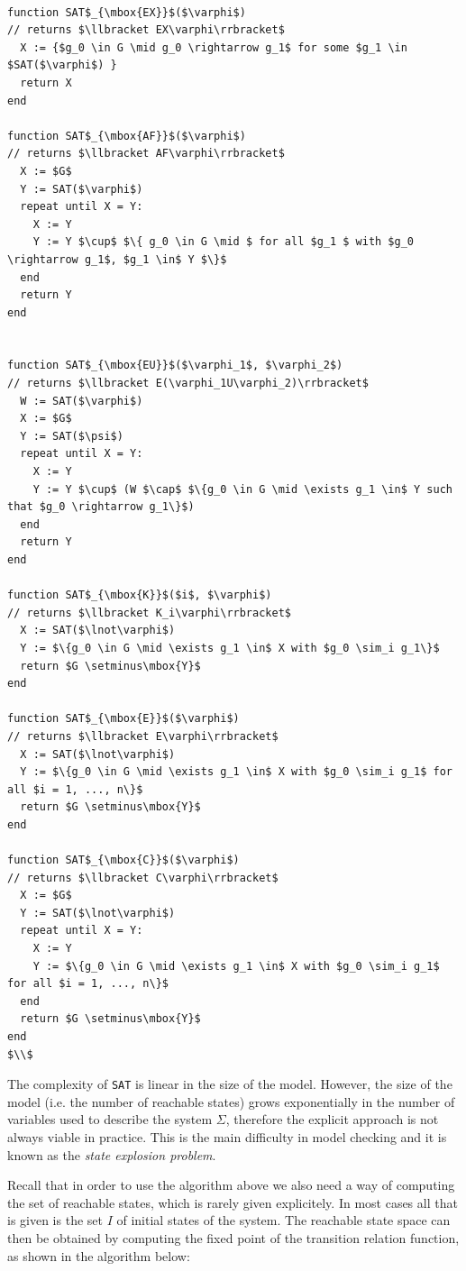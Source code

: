 \documentclass[11pt]{article}
\begin{document}
\begin{lstlisting}[mathescape]

function SAT$_{\mbox{EX}}$($\varphi$)
// returns $\llbracket EX\varphi\rrbracket$
  X := {$g_0 \in G \mid g_0 \rightarrow g_1$ for some $g_1 \in $SAT($\varphi$) }
  return X
end
 
function SAT$_{\mbox{AF}}$($\varphi$)
// returns $\llbracket AF\varphi\rrbracket$
  X := $G$
  Y := SAT($\varphi$)
  repeat until X = Y:
    X := Y
    Y := Y $\cup$ $\{ g_0 \in G \mid $ for all $g_1 $ with $g_0 \rightarrow g_1$, $g_1 \in$ Y $\}$ 
  end
  return Y
end
  

function SAT$_{\mbox{EU}}$($\varphi_1$, $\varphi_2$)
// returns $\llbracket E(\varphi_1U\varphi_2)\rrbracket$
  W := SAT($\varphi$)
  X := $G$
  Y := SAT($\psi$)
  repeat until X = Y:
    X := Y
    Y := Y $\cup$ (W $\cap$ $\{g_0 \in G \mid \exists g_1 \in$ Y such that $g_0 \rightarrow g_1\}$)
  end
  return Y
end

function SAT$_{\mbox{K}}$($i$, $\varphi$)
// returns $\llbracket K_i\varphi\rrbracket$
  X := SAT($\lnot\varphi$)
  Y := $\{g_0 \in G \mid \exists g_1 \in$ X with $g_0 \sim_i g_1\}$
  return $G \setminus\mbox{Y}$
end

function SAT$_{\mbox{E}}$($\varphi$)
// returns $\llbracket E\varphi\rrbracket$
  X := SAT($\lnot\varphi$)
  Y := $\{g_0 \in G \mid \exists g_1 \in$ X with $g_0 \sim_i g_1$ for all $i = 1, ..., n\}$
  return $G \setminus\mbox{Y}$
end

function SAT$_{\mbox{C}}$($\varphi$)
// returns $\llbracket C\varphi\rrbracket$
  X := $G$
  Y := SAT($\lnot\varphi$)
  repeat until X = Y:
    X := Y
    Y := $\{g_0 \in G \mid \exists g_1 \in$ X with $g_0 \sim_i g_1$ for all $i = 1, ..., n\}$
  end
  return $G \setminus\mbox{Y}$
end
$\\$
\end{lstlisting}
The complexity of \texttt{SAT} is linear in the size of the model. However, the size of the model (i.e. the number of reachable states) grows exponentially in the number of variables used to describe the system $\Sigma$, therefore the explicit approach is not always viable in practice. This is the main difficulty in model checking and it is known as the \textit{state explosion problem}. 

Recall that in order to use the algorithm above we also need a way of computing the set of reachable states, which is rarely given explicitely. In most cases all that is given is the set $I$ of initial states of the system. The reachable state space can then be obtained by computing the fixed point of the transition relation function, as shown in the algorithm below:
\end{document}
